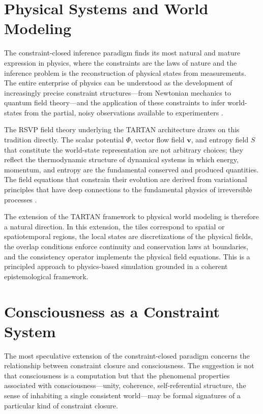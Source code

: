 \documentclass[11pt, oneside]{article}
\begin{document}
\section{Physical Systems and World Modeling}

The constraint-closed inference paradigm finds its most natural and mature expression in physics, where the constraints are the laws of nature and the inference problem is the reconstruction of physical states from measurements. The entire enterprise of physics can be understood as the development of increasingly precise constraint structures---from Newtonian mechanics to quantum field theory---and the application of these constraints to infer world-states from the partial, noisy observations available to experimenters \cite{misner1973gravitation, penrose2004road}.

The RSVP field theory underlying the TARTAN architecture draws on this tradition directly. The scalar potential $\Phi$, vector flow field $\mathbf{v}$, and entropy field $S$ that constitute the world-state representation are not arbitrary choices; they reflect the thermodynamic structure of dynamical systems in which energy, momentum, and entropy are the fundamental conserved and produced quantities. The field equations that constrain their evolution are derived from variational principles that have deep connections to the fundamental physics of irreversible processes \cite{prigogine1984order, jacobson1995}.

The extension of the TARTAN framework to physical world modeling is therefore a natural direction. In this extension, the tiles correspond to spatial or spatiotemporal regions, the local states are discretizations of the physical fields, the overlap conditions enforce continuity and conservation laws at boundaries, and the consistency operator implements the physical field equations. This is a principled approach to physics-based simulation grounded in a coherent epistemological framework.

\section{Consciousness as a Constraint System}

The most speculative extension of the constraint-closed paradigm concerns the relationship between constraint closure and consciousness. The suggestion is not that consciousness is a computation but that the phenomenal properties associated with consciousness---unity, coherence, self-referential structure, the sense of inhabiting a single consistent world---may be formal signatures of a particular kind of constraint closure.
\end{document}
